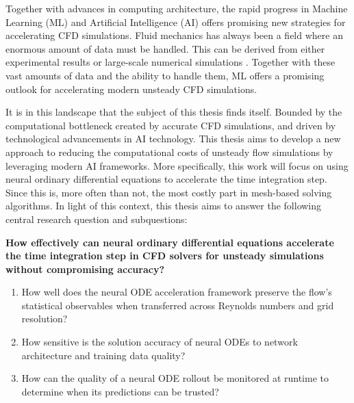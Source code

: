 Together with advances in computing architecture, the rapid progress in Machine Learning (ML) and Artificial Intelligence (AI) offers promising new strategies for accelerating CFD simulations. Fluid mechanics has always been a field where an enormous amount of data must be handled. This can be derived from either experimental results or large-scale numerical simulations \cite{Brunton2020}. Together with these vast amounts of data and the ability to handle them, ML offers a promising outlook for accelerating modern unsteady CFD simulations.

It is in this landscape that the subject of this thesis finds itself. Bounded by the computational bottleneck created by accurate CFD simulations, and driven by technological advancements in AI technology. This thesis aims to develop a new approach to reducing the computational costs of unsteady flow simulations by leveraging modern AI frameworks. More specifically, this work will focus on using neural ordinary differential equations to accelerate the time integration step. Since this is, more often than not, the most costly part in mesh-based solving algorithms. In light of this context, this thesis aims to answer the following central research question and subquestions:


\begin{center}
\begin{minipage}{\textwidth}
\begin{tcolorbox}[colback=gray!5,colframe=black!80,title=Research Question]
\textbf{How effectively can neural ordinary differential equations accelerate the time integration step in CFD solvers for unsteady simulations without compromising accuracy?}
\vspace{1em}

\begin{enumerate}
    \item How well does the neural ODE acceleration framework preserve the flow's statistical observables when transferred across Reynolds numbers and grid resolution?
    \vspace{0.5em}
    \item How sensitive is the solution accuracy of neural ODEs to network architecture and training data quality?
    \vspace{0.5em}
    \item How can the quality of a neural ODE rollout be monitored at runtime to determine when its predictions can be trusted?
\end{enumerate}
\end{tcolorbox}
\end{minipage}
\end{center}

